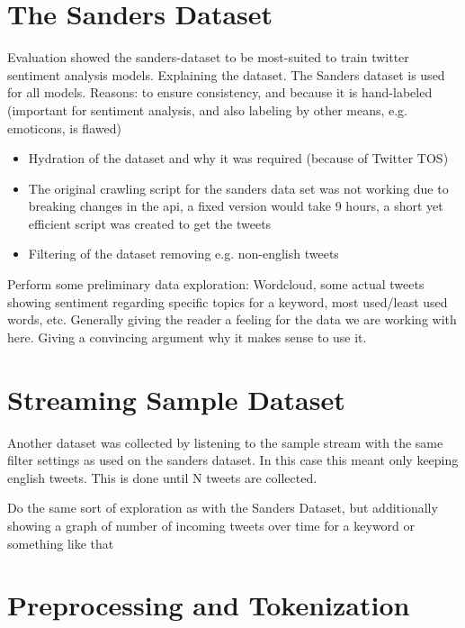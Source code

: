 \section{The Sanders Dataset}
\label{sec:theSandersDataset}

Evaluation showed the sanders-dataset to be most-suited to train twitter sentiment analysis models.
Explaining the dataset.
The Sanders dataset is used for all models.
Reasons: to ensure consistency, and because it is hand-labeled (important for sentiment analysis, and also labeling by other means, e.g. emoticons, is flawed)

\begin{itemize}
    \item
    Hydration of the dataset and why it was required (because of Twitter TOS)
    \item
    The original crawling script for the sanders data set was not working due to breaking changes in the api, a fixed version would take 9 hours, a short yet efficient script was created to get the tweets
    \item
    Filtering of the dataset removing e.g. non-english tweets
\end{itemize}

Perform some preliminary data exploration: Wordcloud, some actual tweets showing sentiment regarding specific topics for a keyword, most used/least used words, etc.
Generally giving the reader a feeling for the data we are working with here.
Giving a convincing argument why it makes sense to use it.

\section{Streaming Sample Dataset}
\label{sec:streamingSampleDataset}

Another dataset was collected by listening to the sample stream with the same filter settings as used on the sanders dataset.
In this case this meant only keeping english tweets.
This is done until N tweets are collected.

Do the same sort of exploration as with the Sanders Dataset, but additionally showing a graph of number of incoming tweets over time for a keyword or something like that

\section{Preprocessing and Tokenization}
\label{sec:preprocessingAndTokenization}

